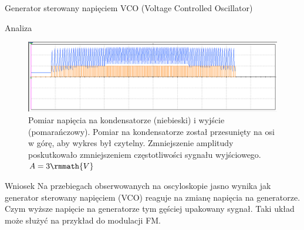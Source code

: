 \documentclass[a4paper]{scrartcl}
\begin{document}
\begin{section}{Generator sterowany napięciem VCO (Voltage Controlled Oscillator)}
\begin{subsection}{Analiza}
				\begin{figure}[!ht]
				\begin{center}
					\includegraphics[width=\linewidth]{05-osc-3v}
					\caption{Pomiar napięcia na kondensatorze (niebieski) i wyjście (pomarańczowy). Pomiar na kondensatorze został przesunięty na osi w górę, aby wykres był czytelny. Zmniejszenie amplitudy poskutkowało zmniejszeniem częstotliwości sygnału wyjściowego. $ A=3\rmmath{V} $}
				\end{center}
				\end{figure}
		\end{subsection}
		\begin{subsection}{Wniosek}
			Na przebiegach obserwowanych na oscyloskopie jasno wynika jak generator sterowany napięciem (VCO) reaguje na zmianę napięcia na generatorze. Czym wyższe napięcie na generatorze tym gęściej upakowany sygnał. Taki układ może służyć na przykład do modulacji FM.
		\end{subsection}
	\end{section}
\end{document}
